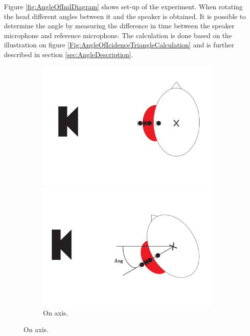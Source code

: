 Figure \ref{fig:AngleOfIndDiagram} shows set-up of the experiment. When rotating the head different angles between it and the speaker is obtained. It is possible to determine the angle by measuring the difference in time between the speaker microphone and reference microphone. The calculation is done based on the illustration on figure \ref{Fig:AngleOfIcidenceTriangleCalculation} and is further described in section \ref{sec:AngleDescription}.

\begin{figure}[H]
	\centering
	\begin{subfigure}[b]{.4\textwidth}
		\includegraphics[width=\textwidth]{../Journal/Experiments/AngleOfIncidence/AngleOfIncidenceOnAxis.pdf}
		\caption{On axis.}
		\label{fig:AngOfIndOnax}
		\vspace{2ex}
		\includegraphics[width=\textwidth]{../Journal/Experiments/AngleOfIncidence/AngleOfIncidenceOffAxis.pdf}

\end{subfigure}
\end{figure}
